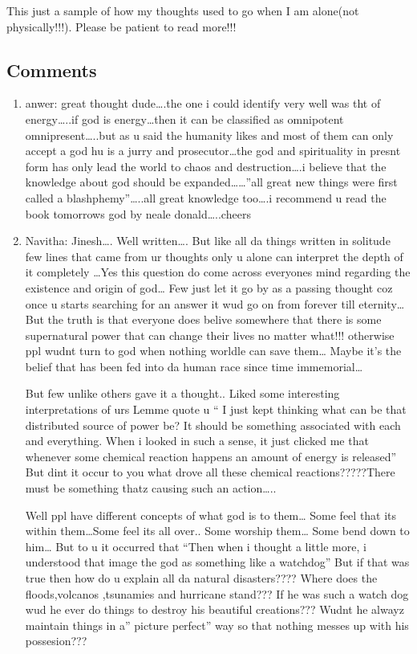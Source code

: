 This just a sample of how my thoughts used to go when I am alone(not physically!!!). Please be patient to read more!!!

\subsection*{Comments}
\begin{enumerate}
\item{anwer: }
great thought dude….the one i could identify very well was tht of energy…..if god is energy…then it can be classified as omnipotent omnipresent…..but as u said the humanity likes and most of them can only accept a god hu is a jurry and prosecutor…the god and spirituality in presnt form has only lead the world to chaos and destruction….i believe that the knowledge about god should be expanded……”all great new things were first called a blashphemy”…..all great knowledge too….i recommend u read the book tomorrows god by neale donald…..cheers

\item{Navitha: }
Jinesh…. Well written…. But like all da things written in solitude few lines that came from ur thoughts only u alone can interpret the depth of it completely …Yes this question do come across everyones mind regarding the existence and origin of god… Few just let it go by as a passing thought coz once u starts searching for an answer it wud go on from forever till eternity…But the truth is that everyone does belive somewhere that there is some supernatural power that can change their lives no matter what!!! otherwise ppl wudnt turn to god when nothing worldle can save them… Maybe it’s the belief that has been fed into da human race since time immemorial…

But few unlike others gave it a thought.. Liked some interesting interpretations of urs
Lemme quote u “ I just kept thinking what can be that distributed source of power be? It should be something associated with each and everything. When i looked in such a sense, it just clicked me that whenever some chemical reaction happens an amount of energy is released” But dint it occur to you what drove all these chemical reactions?????There must be something thatz causing such an action…..

Well ppl have different concepts of what god is to them… Some feel that its within them…Some feel its all over.. Some worship them… Some bend down to him…
But to u it occurred that “Then when i thought a little more, i understood that image the god as something like a watchdog” But if that was true then how do u explain all da natural disasters???? Where does the floods,volcanos ,tsunamies and hurricane stand??? If he was such a watch dog wud he ever do things to destroy his beautiful creations??? Wudnt he alwayz maintain things in a” picture perfect” way so that nothing messes up with his possesion???



\end{enumerate}
